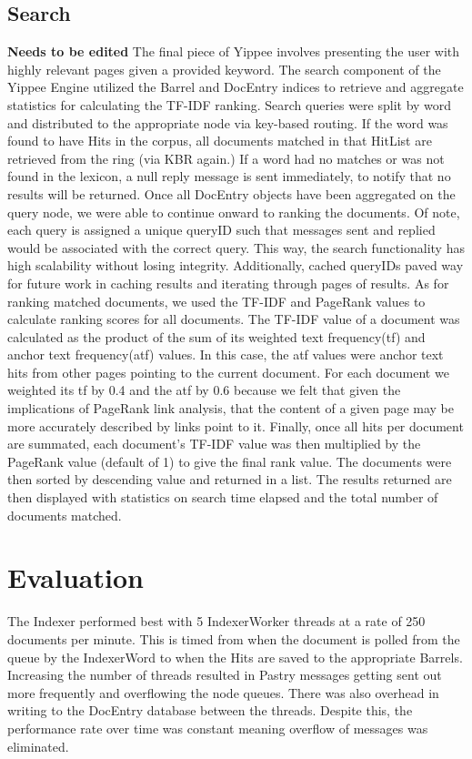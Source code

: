 \documentclass[11pt, letterpaper, oneside, twocolumn]{article}
\begin{document}
\subsection{Search}
\textbf{Needs to be edited}
The final piece of Yippee involves presenting the user with highly relevant pages given a provided keyword.
The search component of the Yippee Engine utilized the Barrel and DocEntry indices to retrieve and aggregate statistics for calculating the TF-IDF ranking. 
Search queries were split by word and distributed to the appropriate node via key-based routing. 
If the word was found to have Hits in the corpus, all documents matched in that HitList are retrieved from the ring (via KBR again.) 
If a word had no matches or was not found in the lexicon, a null reply message is sent immediately, to notify that no results will be returned. 
Once all DocEntry objects have been aggregated on the query node, we were able to continue onward to ranking the documents. 
Of note, each query is assigned a unique queryID such that messages sent and replied would be associated with the correct query. 
This way, the search functionality has high scalability without losing integrity. 
Additionally, cached queryIDs paved way for future work in caching results and iterating through pages of results.
As for ranking matched documents, we used the TF-IDF and PageRank values to calculate ranking scores for all documents. 
The TF-IDF value of a document was calculated as the product of the sum of its weighted text frequency(tf) and anchor text frequency(atf) values. 
In this case, the atf values were anchor text hits from other pages pointing to the current document. For each document we weighted its tf by 0.4 and the atf by 0.6 because we felt that given the implications of PageRank link analysis, that the content of a given page may be more accurately described by links point to it. 
Finally, once all hits per document are summated, each document's TF-IDF value was then multiplied by the PageRank value (default of 1) to give the final rank value. 
The documents were then sorted by descending value and returned in a list.
The results returned are then displayed with statistics on search time elapsed and the total number of documents matched.

\section{Evaluation}
\label{sec:evaluation}

The Indexer performed best with 5 IndexerWorker threads at a rate of 250 documents per minute. 
This is timed from when the document is polled from the queue by the IndexerWord to when the Hits are saved to the appropriate Barrels. 
Increasing the number of threads resulted in Pastry messages getting sent out more frequently and overflowing the node queues. 
There was also overhead in writing to the DocEntry database between the threads. 
Despite this, the performance rate over time was constant meaning overflow of messages was eliminated. 
\end{document}
